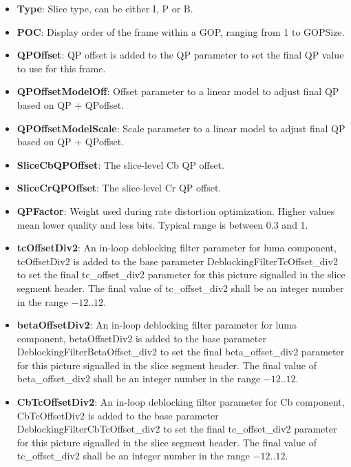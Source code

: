 ﻿\documentclass[a4paper,11pt]{jvetdoc}
\begin{document}
\begin{itemize}
\item[]\textbf{Type}: Slice type, can be either I, P or B.

\item[]\textbf{POC}: Display order of the frame within a GOP, ranging
from 1 to GOPSize.

\item[]\textbf{QPOffset}: QP offset is added to the QP parameter to set
the final QP value to use for this frame.

\item[]\textbf{QPOffsetModelOff}: Offset parameter to a linear model to adjust final QP based on QP + QPoffset.

\item[]\textbf{QPOffsetModelScale}: Scale parameter to a linear model to adjust final QP based on QP + QPoffset.

\item[]\textbf{SliceCbQPOffset}: The slice-level Cb QP offset.

\item[]\textbf{SliceCrQPOffset}: The slice-level Cr QP offset.

\item[]\textbf{QPFactor}: Weight used during rate distortion
optimization. Higher values mean lower quality and less bits. Typical
range is between
0.3 and 1.

\item[]\textbf{tcOffsetDiv2}: An in-loop deblocking filter parameter for luma component, tcOffsetDiv2 
is added to the base parameter DeblockingFilterTcOffset_div2 to set the final tc_offset_div2 
parameter for this picture signalled in the slice segment header. The final 
value of tc_offset_div2 shall be an integer number in the range $-12..12$.

\item[]\textbf{betaOffsetDiv2}: An in-loop deblocking filter parameter for luma component, betaOffsetDiv2 
is added to the base parameter DeblockingFilterBetaOffset_div2 to set the final beta_offset_div2 
parameter for this picture signalled in the slice segment header. The final 
value of beta_offset_div2 shall be an integer number in the range $-12..12$.

\item[]\textbf{CbTcOffsetDiv2}: An in-loop deblocking filter parameter for Cb component, CbTcOffsetDiv2 
is added to the base parameter DeblockingFilterCbTcOffset_div2 to set the final tc_offset_div2 
parameter for this picture signalled in the slice segment header. The final 
value of tc_offset_div2 shall be an integer number in the range $-12..12$.


\end{itemize}
\end{document}
